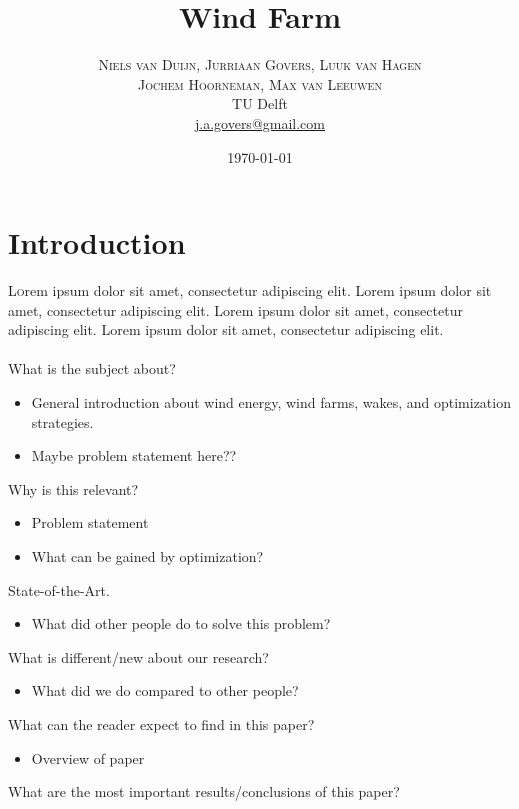 \documentclass[twoside,twocolumn]{article}
\title{Wind Farm} %
\author{%
	\textsc{Niels van Duijn, Jurriaan Govers, Luuk van Hagen}\\
	\textsc{Jochem Hoorneman, Max van Leeuwen}\\%
	\normalsize TU Delft \\ %
	\normalsize \href{mailto:j.a.govers@gmail.com}{j.a.govers@gmail.com} %
}
\date{\today} %
\begin{document}
	
	\maketitle
	
	
	\section{Introduction}
	
	\lettrine[nindent=0em,lines=3]{L} orem ipsum dolor sit amet, consectetur adipiscing elit. Lorem ipsum dolor sit amet, consectetur adipiscing elit. Lorem ipsum dolor sit amet, consectetur adipiscing elit. Lorem ipsum dolor sit amet, consectetur adipiscing elit.
	\\
	\\
	What is the subject about?
	\begin{itemize}
		\item General introduction about wind energy, wind farms, wakes, and optimization strategies.
		\item Maybe problem statement here??
	\end{itemize}
	Why is this relevant?
	\begin{itemize}
		\item Problem statement
		\item What can be gained by optimization?
	\end{itemize}
	State-of-the-Art.
	\begin{itemize}
		\item What did other people do to solve this problem?
	\end{itemize}
	What is different/new about our research?
	\begin{itemize}
		\item What did we do compared to other people?
	\end{itemize}
	 What can the reader expect to find in this paper?
	\begin{itemize}
		\item Overview of paper
	\end{itemize}
	What are the most important results/conclusions of this paper?
	
	
	
\end{document}
